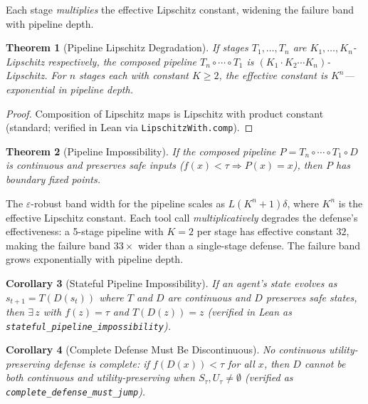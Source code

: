 \documentclass[11pt]{article}
\newtheorem{theorem}{Theorem}[section]
\newtheorem{corollary}[theorem]{Corollary}
\begin{document}
Each stage \emph{multiplies} the effective Lipschitz constant,
widening the failure band with pipeline depth.

\begin{theorem}[Pipeline Lipschitz Degradation]
\label{thm:pipeline}
If stages $T_1, \ldots, T_n$ are $K_1, \ldots, K_n$-Lipschitz
respectively, the composed pipeline $T_n \circ \cdots \circ T_1$ is
$(K_1 \cdot K_2 \cdots K_n)$-Lipschitz. For $n$ stages each with
constant $K \geq 2$, the effective constant is $K^n$---exponential
in pipeline depth.
\end{theorem}

\begin{proof}
Composition of Lipschitz maps is Lipschitz with product constant
(standard; verified in Lean via \texttt{LipschitzWith.comp}).
\end{proof}

\begin{theorem}[Pipeline Impossibility]
\label{thm:pipeline-impossible}
If the composed pipeline $P = T_n \circ \cdots \circ T_1 \circ D$ is
continuous and preserves safe inputs ($f(x) < \tau \Rightarrow
P(x) = x$), then $P$ has boundary fixed points.
\end{theorem}

The $\varepsilon$-robust band width for the pipeline scales as
$L(K^n + 1)\delta$, where $K^n$ is the effective Lipschitz constant.
Each tool call \emph{multiplicatively} degrades the defense's
effectiveness: a 5-stage pipeline with $K = 2$ per stage has
effective constant $32$, making the failure band $33\times$ wider than
a single-stage defense. The failure band grows exponentially with
pipeline depth.

\begin{corollary}[Stateful Pipeline Impossibility]
\label{cor:stateful}
If an agent's state evolves as $s_{t+1} = T(D(s_t))$ where $T$ and $D$ are continuous and $D$ preserves safe states, then $\exists\, z$ with $f(z) = \tau$ and $T(D(z)) = z$ (verified in Lean as \texttt{stateful\_pipeline\_impossibility}).
\end{corollary}

\begin{corollary}[Complete Defense Must Be Discontinuous]
\label{cor:jump}
No continuous utility-preserving defense is complete: if $f(D(x)) < \tau$ for all $x$, then $D$ cannot be both continuous and utility-preserving when $S_\tau, U_\tau \neq \emptyset$ (verified as \texttt{complete\_defense\_must\_jump}).
\end{corollary}
\end{document}
